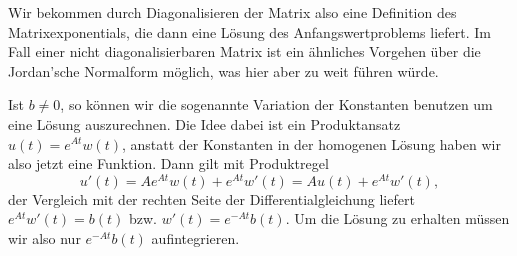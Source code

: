 Wir bekommen durch Diagonalisieren der Matrix also eine Definition des Matrixexponentials, die dann eine Lösung des Anfangswertproblems liefert. Im Fall einer nicht diagonalisierbaren Matrix ist ein ähnliches Vorgehen über die Jordan'sche Normalform möglich, was hier aber zu weit führen würde.

Ist $b \neq 0$, so können wir die sogenannte Variation der Konstanten benutzen um eine Lösung auszurechnen. Die Idee dabei ist ein Produktansatz $u(t) = e^{At} w(t)$, anstatt der Konstanten in der homogenen Lösung haben wir also jetzt eine Funktion. Dann gilt mit Produktregel
$$ u'(t) = A e^{At} w(t) + e^{At}w'(t) = Au(t) + e^{At}w'(t), $$
der Vergleich mit der rechten Seite der Differentialgleichung liefert $e^{At} w'(t) = b(t)$ bzw. $w'(t) = e^{-At} b(t). $
Um die Lösung zu erhalten müssen wir also nur $e^{-At} b(t)$ aufintegrieren. 

